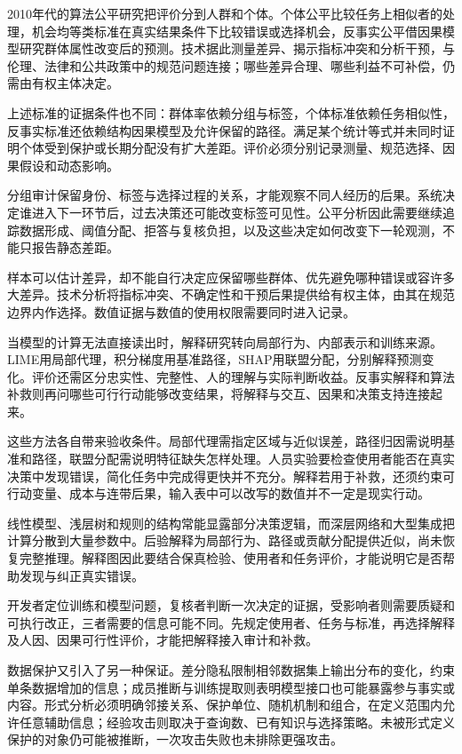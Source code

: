 2010年代的算法公平研究把评价分到人群和个体。个体公平比较任务上相似者的处理，机会均等类标准在真实结果条件下比较错误或选择机会，反事实公平借因果模型研究群体属性改变后的预测。技术据此测量差异、揭示指标冲突和分析干预，与伦理、法律和公共政策中的规范问题连接；哪些差异合理、哪些利益不可补偿，仍需由有权主体决定。

上述标准的证据条件也不同：群体率依赖分组与标签，个体标准依赖任务相似性，反事实标准还依赖结构因果模型及允许保留的路径。满足某个统计等式并未同时证明个体受到保护或长期分配没有扩大差距。评价必须分别记录测量、规范选择、因果假设和动态影响。

分组审计保留身份、标签与选择过程的关系，才能观察不同人经历的后果。系统决定谁进入下一环节后，过去决策还可能改变标签可见性。公平分析因此需要继续追踪数据形成、阈值分配、拒答与复核负担，以及这些决定如何改变下一轮观测，不能只报告静态差距。

样本可以估计差异，却不能自行决定应保留哪些群体、优先避免哪种错误或容许多大差异。技术分析将指标冲突、不确定性和干预后果提供给有权主体，由其在规范边界内作选择。数值证据与数值的使用权限需要同时进入记录。

当模型的计算无法直接读出时，解释研究转向局部行为、内部表示和训练来源。LIME用局部代理，积分梯度用基准路径，SHAP用联盟分配，分别解释预测变化。评价还需区分忠实性、完整性、人的理解与实际判断收益。反事实解释和算法补救则再问哪些可行行动能够改变结果，将解释与交互、因果和决策支持连接起来。

这些方法各自带来验收条件。局部代理需指定区域与近似误差，路径归因需说明基准和路径，联盟分配需说明特征缺失怎样处理。人员实验要检查使用者能否在真实决策中发现错误，简化任务中完成得更快并不充分。解释若用于补救，还须约束可行动变量、成本与连带后果，输入表中可以改写的数值并不一定是现实行动。

线性模型、浅层树和规则的结构常能显露部分决策逻辑，而深层网络和大型集成把计算分散到大量参数中。后验解释为局部行为、路径或贡献分配提供近似，尚未恢复完整推理。解释图因此要结合保真检验、使用者和任务评价，才能说明它是否帮助发现与纠正真实错误。

开发者定位训练和模型问题，复核者判断一次决定的证据，受影响者则需要质疑和可执行改正，三者需要的信息可能不同。先规定使用者、任务与标准，再选择解释及人因、因果可行性评价，才能把解释接入审计和补救。

数据保护又引入了另一种保证。差分隐私限制相邻数据集上输出分布的变化，约束单条数据增加的信息；成员推断与训练提取则表明模型接口也可能暴露参与事实或内容。形式分析必须明确邻接关系、保护单位、随机机制和组合，在定义范围内允许任意辅助信息；经验攻击则取决于查询数、已有知识与选择策略。未被形式定义保护的对象仍可能被推断，一次攻击失败也未排除更强攻击。

